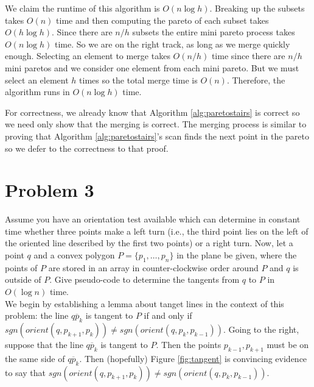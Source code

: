 \documentclass[11pt]{article}
\begin{document}
\begin{enumerate}
    We claim the runtime of this algorithm is $O(n \log h)$.
    Breaking up the subsets takes $O(n)$ time and then computing the pareto of each subset takes $O(h \log h)$.
    Since there are $n/h$ subsets the entire mini pareto process takes $O(n \log h)$ time.
    So we are on the right track, as long as we merge quickly enough.
    Selecting an element to merge takes $O(n/h)$ time since there are $n/h$ mini paretos and we consider one element from each mini pareto.
    But we must select an element $h$ times so the total merge time is $O(n)$.
    Therefore, the algorithm runs in $O(n \log h)$ time.

    For correctness, we already know that Algorithm \ref{alg:paretostairs} is correct so we need only show that the merging is correct.
    The merging process is similar to proving that Algorithm \ref{alg:paretostairs}'s scan finds the next point in the pareto so we defer to the correctness to that proof.

\end{enumerate}

\newpage
\section*{Problem 3}

Assume you have an orientation test available which can determine in constant
time whether three points make a left turn (i.e., the third point lies on the
left of the oriented line described by the first two points) or a right turn.
Now, let a point $q$ and a convex polygon $P = \{ p_1, \ldots , p_n \}$ in the
plane be given, where the points of $P$ are stored in an array in
counter-clockwise order around $P$ and $q$ is outside of $P$. Give pseudo-code
to determine the tangents from $q$ to $P$ in $O(\log n)$ time. \\

\answer
We begin by establishing a lemma about tanget lines in the context of this problem: the line $\overline{qp_k}$ is tangent to $P$ if and only if $sgn(orient(q, p_{k+1}, p_k)) \neq sgn(orient(q, p_k, p_{k-1}))$.
Going to the right, suppose that the line $\overline{qp_k}$ is tangent to $P$.
Then the points $p_{k-1}, p_{k+1}$ must be on the same side of $\overline{q p_k}$.
Then (hopefully) Figure \ref{fig:tangent} is convincing evidence to say that $sgn(orient(q, p_{k+1}, p_k)) \neq sgn(orient(q, p_k, p_{k-1}))$.
\end{document}
